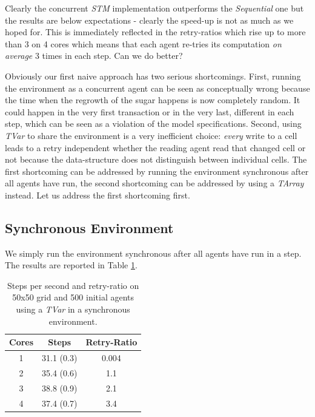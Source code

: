 Clearly the concurrent \textit{STM} implementation outperforms the \textit{Sequential} one but the results are below expectations - clearly the speed-up is not as much as we hoped for. This is immediately reflected in the retry-ratios which rise up to more than 3 on 4 cores which means that each agent re-tries its computation \textit{on average} 3 times in each step. Can we do better?

Obviously our first naive approach has two serious shortcomings. First, running the environment as a concurrent agent can be seen as conceptually wrong because the time when the regrowth of the sugar happens is now completely random. It could happen in the very first transaction or in the very last, different in each step, which can be seen as a violation of the model specifications. Second, using \textit{TVar} to share the environment is a very inefficient choice: \textit{every} write to a cell leads to a retry independent whether the reading agent read that changed cell or not because the data-structure does not distinguish between individual cells. The first shortcoming can be addressed by running the environment synchronous after all agents have run, the second shortcoming can be addressed by using a \textit{TArray} instead. Let us address the first shortcoming first.

\subsection{Synchronous Environment}
We simply run the environment synchronous after all agents have run in a step. The results are reported in Table \ref{tab:naive_results_syncenv_time}.

\begin{table}
	\centering
  	\begin{tabular}{ c || c | c }
        Cores & Steps          & Retry-Ratio \\ \hline \hline 
    	1     & 31.1 (0.3) & 0.004 		     \\ \hline
   		2     & 35.4 (0.6) & 1.1 			 \\ \hline
   		3     & 38.8 (0.9) & 2.1 			 \\ \hline
   		4     & 37.4 (0.7) & 3.4
   	\end{tabular}
  	
  	\caption{Steps per second and retry-ratio on 50x50 grid and 500 initial agents using a \textit{TVar} in a synchronous environment.}
	\label{tab:naive_results_syncenv_time}
\end{table}

